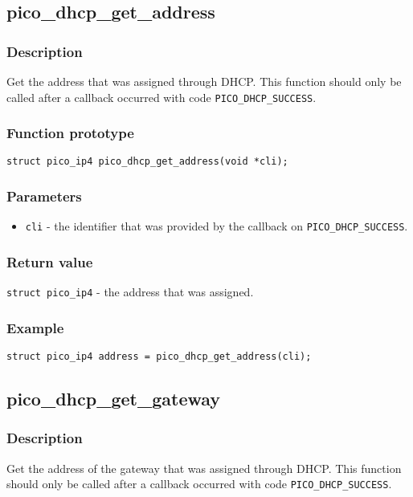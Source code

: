 \subsection{pico\_dhcp\_get\_address}

\subsubsection*{Description}
Get the address that was assigned through DHCP. This function should only be called after a callback occurred with code \texttt{PICO\_DHCP\_SUCCESS}. 

\subsubsection*{Function prototype}
\texttt{struct pico\_ip4 pico\_dhcp\_get\_address(void *cli);}

\subsubsection*{Parameters}
\begin{itemize}[noitemsep]
\item \texttt{cli} - the identifier that was provided by the callback on \texttt{PICO\_DHCP\_SUCCESS}.
\end{itemize}

\subsubsection*{Return value}
\texttt{struct pico\_ip4} - the address that was assigned.


\subsubsection*{Example}
\begin{verbatim}
struct pico_ip4 address = pico_dhcp_get_address(cli);
\end{verbatim}


\subsection{pico\_dhcp\_get\_gateway}

\subsubsection*{Description}
Get the address of the gateway that was assigned through DHCP. This function should
only be called after a callback occurred with code \texttt{PICO\_DHCP\_SUCCESS}. 

